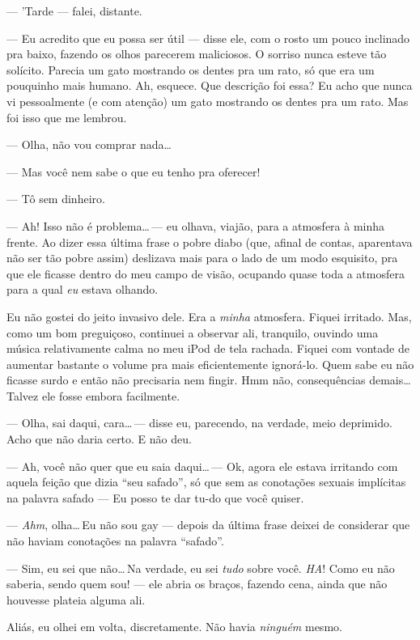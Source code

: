 --- 'Tarde --- falei, distante.

--- Eu acredito que eu possa ser útil --- disse ele, com o rosto um pouco inclinado pra baixo, fazendo os olhos parecerem maliciosos. O sorriso nunca esteve tão solícito. Parecia um gato mostrando os dentes pra um rato, só que era um pouquinho mais humano. Ah, esquece. Que descrição foi essa? Eu acho que nunca vi pessoalmente (e com atenção) um gato mostrando os dentes pra um rato. Mas foi isso que me lembrou.

--- Olha, não vou comprar nada\ldots

--- Mas você nem sabe o que eu tenho pra oferecer!

--- Tô sem dinheiro.

--- Ah! Isso não é problema\ldots\,--- eu olhava, viajão, para a atmosfera à minha frente. Ao dizer essa última frase o pobre diabo (que, afinal de contas, aparentava não ser tão pobre assim) deslizava mais para o lado de um modo esquisito, pra que ele ficasse dentro do meu campo de visão, ocupando quase toda a atmosfera para a qual \emph{eu} estava olhando.

Eu não gostei do jeito invasivo dele. Era a \emph{minha} atmosfera. Fiquei irritado. Mas, como um bom preguiçoso, continuei a observar ali, tranquilo, ouvindo uma música relativamente calma no meu iPod de tela rachada. Fiquei com vontade de aumentar bastante o volume pra mais eficientemente ignorá-lo. Quem sabe eu não ficasse surdo e então não precisaria nem fingir. Hmm não, consequências demais\ldots\,Talvez ele fosse embora facilmente.

--- Olha, sai daqui, cara\ldots\,--- disse eu, parecendo, na verdade, meio deprimido. Acho que não daria certo. E não deu.

--- Ah, você não quer que eu saia daqui\ldots\,--- Ok, agora ele estava irritando com aquela feição que dizia ``seu safado'', só que sem as conotações sexuais implícitas na palavra safado --- Eu posso te dar tu-do que você quiser.

--- \emph{Ahm}, olha\ldots\,Eu não sou gay --- depois da última frase deixei de considerar que não haviam conotações na palavra ``safado''.

--- Sim, eu sei que não\ldots\,Na verdade, eu sei \emph{tudo} sobre você. \emph{HA}! Como eu não saberia, sendo quem sou! --- ele abria os braços, fazendo cena, ainda que não houvesse plateia alguma ali.

Aliás, eu olhei em volta, discretamente. Não havia \emph{ninguém} mesmo.

